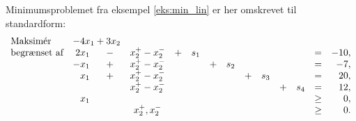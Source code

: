 %
\begin{eks}
Minimumsproblemet fra eksempel \ref{eks:min_lin} er her omskrevet til standardform:
%
\begin{align*}
\begin{array}{lrcccrcrcrcrcrcr}
\text{Maksimér}		&	\multicolumn{2}{c}{-4x_1 + 3x_2}\\
\text{begrænset af}	&2x_1	&-	&x_2^+-x_2^-		&+	&s_1&	&	&	&	&	&	&= 		&-10,\\
					&-x_1	&+	&x_2^+-x_2^-		&	&	&+	&s_2&	&	&	&	&=		& -7,\\
					&x_1	&+	&x_2^+-x_2^-		&	&	&	&	&+	&s_3&	&	&=		& 20,\\
					& 		&	&x_2^+-x_2^-&	&	&	&	&	&	&+	&s_4&=		& 12,\\
					&x_1	&	&			&	&	&	&	&	&	&	&	&\geq	& 0,\\
					&		&	&x_2^+,x_2^-&	&	&	&	&	&	&	&	&\geq	& 0.\\
\end{array}
\end{align*}
\end{eks}
%